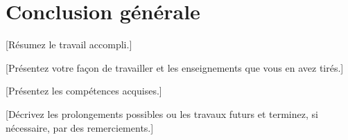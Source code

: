 \chapter*{Conclusion générale}

[Résumez le travail accompli.]

[Présentez votre façon de travailler et les enseignements que vous en avez tirés.]

[Présentez les compétences acquises.]

[Décrivez les prolongements possibles ou les travaux futurs et terminez, si nécessaire, par des remerciements.]
